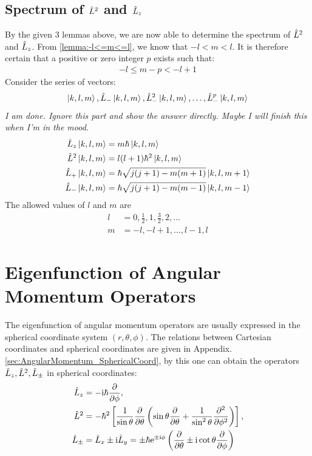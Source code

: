 \subsection{Spectrum of \texorpdfstring{$\hat{L}^2$}{L²} and \texorpdfstring{$\hat{L}_z$}{Lz}}

By the given 3 lemmas above, we are now able to determine the spectrum of $\hat{L}^2$ and $\hat{L}_z$. From \cref{lemma:-l<=m<=l}, we know that $-l<m<l$. It is therefore certain that a positive or zero integer $p$ exists such that: 
\begin{align}
    -l \leq m-p < -l+1
\end{align}
Consider the series of vectors: 
\begin{align}
    \ket{k,l,m}, \hat{L}_- \ket{k,l,m}, \hat{L}_-^2 \ket{k,l,m}, \ldots, \hat{L}_-^p \ket{k,l,m}
\end{align}
\large
\emph{I am done. Ignore this part and show the answer directly. Maybe I will finish this when I’m in the mood.
}
\begin{align}
    \hat{L}_z \ket{k,l,m} &= m\hbar \ket{k,l,m} \\
    \hat{L}^2 \ket{k,l,m} &= l(l+1)\hbar^2 \ket{k,l,m} \\
    \hat{L}_+ \ket{k,l,m} &= \hbar \sqrt{j(j+1)-m(m+1)} \ket{k,l,m+1} \\
    \hat{L}_- \ket{k,l,m} &= \hbar \sqrt{j(j+1)-m(m-1)} \ket{k,l,m-1}
\end{align}
The allowed values of $l$ and $m$ are 
\begin{align}
    l &= 0, \frac{1}{2}, 1, \frac{3}{2}, 2, \ldots \\
    m &= -l, -l+1, \ldots, l-1, l
\end{align}


\section{Eigenfunction of Angular Momentum Operators}

The eigenfunction of angular momentum operators are usually expressed in the spherical coordinate system $(r,\theta,\phi)$. The relations between Cartesian coordinates and spherical coordinates are given in Appendix. \ref{sec:AngularMomentum_SphericalCoord}, by this one can obtain the operators $\hat{L}_z, \hat{L}^2,\hat{L}_{\pm}$ in spherical coordinates: 
\begin{align}
    \hat{L}_z &= - \mathrm{i} \hbar \frac{\partial }{\partial \phi} ,\\
    \hat{L}^2 &= - \hbar^2 \left[\frac{1}{\sin \theta} \frac{\partial }{\partial \theta} \left(\sin \theta \frac{\partial }{\partial \theta} + \frac{1}{\sin^2 \theta} \frac{\partial^2}{\partial \phi^2}\right)\right], \\
    \hat{L}_{\pm} & = \hat{L}_x \pm \mathrm{i} \hat{L}_y = \pm \hbar \mathrm{e}^{\pm \mathrm{i} \phi} \left(\frac{\partial }{\partial \theta} \pm \mathrm{i} \cot \theta \frac{\partial }{\partial \phi}\right)
\end{align}

